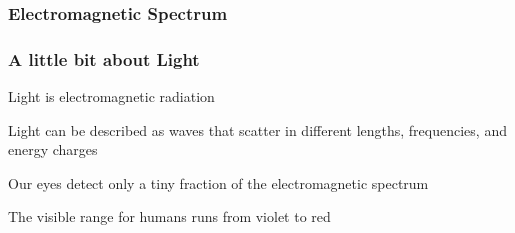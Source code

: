 \documentclass[12pt]{beamer}\usepackage[]{graphicx}\usepackage[]{color}
\begin{document}

\begin{frame}
\frametitle{Electromagnetic Spectrum}
\begin{center}
\end{center}
\end{frame}


\begin{frame}
\frametitle{A little bit about Light}

\bbi
  \item Light is electromagnetic radiation
  \item Light can be described as waves that scatter in different lengths,
  frequencies, and energy charges
  \item Our eyes detect only a tiny fraction of the electromagnetic spectrum
  \item The visible range for humans runs from violet to red
\ei

\end{frame}


\begin{frame}
\begin{center}
\Huge{}
\end{center}
\end{frame}


{ %
    \begin{frame}[plain]
     \end{frame}
}
\end{document}
